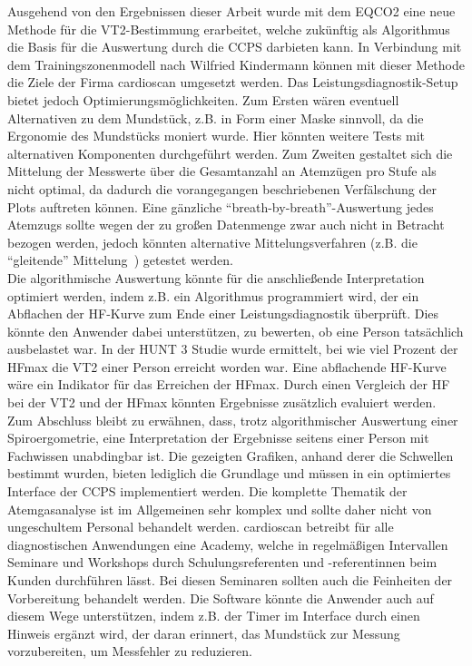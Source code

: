 Ausgehend von den Ergebnissen dieser Arbeit wurde mit dem \acs{EQCO2} eine neue Methode für die VT2-Bestimmung erarbeitet, welche zukünftig als Algorithmus die Basis für die Auswertung durch die \acs{CCPS} darbieten kann. In Verbindung mit dem Trainingszonenmodell nach Wilfried Kindermann können mit dieser Methode die Ziele der Firma cardioscan umgesetzt werden. Das Leistungsdiagnostik-Setup bietet jedoch Optimierungsmöglichkeiten. Zum Ersten wären eventuell Alternativen zu dem Mundstück, z.B. in Form einer Maske sinnvoll, da die Ergonomie des Mundstücks moniert wurde. Hier könnten weitere Tests mit alternativen Komponenten durchgeführt werden. Zum Zweiten gestaltet sich die Mittelung der Messwerte über die Gesamtanzahl an Atemzügen pro Stufe als nicht optimal, da dadurch die vorangegangen beschriebenen Verfälschung der Plots auftreten können. Eine gänzliche "`breath-by-breath"'-Auswertung jedes Atemzugs sollte wegen der zu großen Datenmenge zwar auch nicht in Betracht bezogen werden, jedoch könnten alternative Mittelungsverfahren (z.B. die "`gleitende"' Mittelung~\cite{Kroidl.2015}) getestet werden.\\
Die algorithmische Auswertung könnte für die anschließende Interpretation optimiert werden, indem z.B. ein Algorithmus programmiert wird, der ein Abflachen der \acs{HF}-Kurve zum Ende einer Leistungsdiagnostik überprüft. Dies könnte den Anwender dabei unterstützen, zu bewerten, ob eine Person tatsächlich ausbelastet war. In der HUNT 3 Studie wurde ermittelt, bei wie viel Prozent der \acs{HFmax} die VT2 einer Person erreicht worden war. Eine abflachende \acs{HF}-Kurve wäre ein Indikator für das Erreichen der \acs{HFmax}. Durch einen Vergleich der \acs{HF} bei der VT2 und der \acs{HFmax} könnten Ergebnisse zusätzlich evaluiert werden.\\
Zum Abschluss bleibt zu erwähnen, dass, trotz algorithmischer Auswertung einer Spiroergometrie, eine Interpretation der Ergebnisse seitens einer Person mit Fachwissen unabdingbar ist. Die gezeigten Grafiken, anhand derer die Schwellen bestimmt wurden, bieten lediglich die Grundlage und müssen in ein optimiertes Interface der \acs{CCPS} implementiert werden. Die komplette Thematik der Atemgasanalyse ist im Allgemeinen sehr komplex und sollte daher nicht von ungeschultem Personal behandelt werden. cardioscan betreibt für alle diagnostischen Anwendungen eine Academy, welche in regelmäßigen Intervallen Seminare und Workshops durch Schulungsreferenten und -referentinnen beim Kunden durchführen lässt. Bei diesen Seminaren sollten auch die Feinheiten der Vorbereitung behandelt werden. Die Software könnte die Anwender auch auf diesem Wege unterstützen, indem z.B. der Timer im Interface durch einen Hinweis ergänzt wird, der daran erinnert, das Mundstück zur Messung vorzubereiten, um Messfehler zu reduzieren.


\nocite{*}


%
\printbibliography